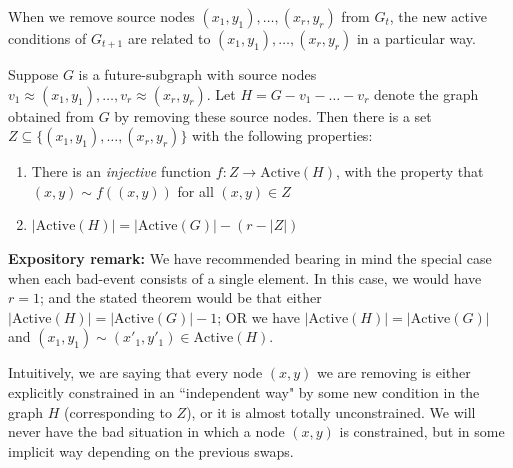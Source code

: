 When we remove source nodes $(x_1, y_1),  \dots, (x_r, y_r)$ from $G_t$, the new active conditions of $G_{t+1}$ are related to $(x_1, y_1), \dots, (x_r, y_r)$ in a particular way.
\begin{lemma}
\label{active-change-lemma}
Suppose $G$ is a future-subgraph with source nodes $v_1 \approx (x_1, y_1), \dots, v_r \approx (x_r, y_r)$. Let $H = G - v_1 - \dots - v_r$ denote the graph obtained from $G$ by removing these source nodes. Then there is a set $Z \subseteq \{ (x_1, y_1), \dots, (x_r, y_r) \}$ with the following properties:
\begin{enumerate}
\item There is an \emph{injective} function $f : Z \rightarrow \text{Active}(H)$, with the property that $(x,y) \sim f( (x,y) )$ for all $(x,y) \in Z$
\item $|\text{Active}(H)| = |\text{Active}(G)| - (r - |Z|)$
\end{enumerate}

\textbf{Expository remark:} We have recommended bearing in mind the special case when each bad-event consists of a single element. In this case, we would have $r = 1$; and the stated theorem would be that either $|\text{Active}(H)| = |\text{Active}(G)| - 1$; OR we have  $|\text{Active}(H)| = |\text{Active}(G)| $ and $(x_1, y_1) \sim (x'_1, y'_1) \in \text{Active}(H)$.

Intuitively, we are saying that every node $(x, y)$ we are removing is either explicitly constrained in an ``independent way" by some new condition in the graph $H$ (corresponding to $Z$), or it is almost totally unconstrained. We will never have the bad situation in which a node $(x,y)$ is constrained, but in some implicit way depending on the previous swaps.


\end{lemma}
